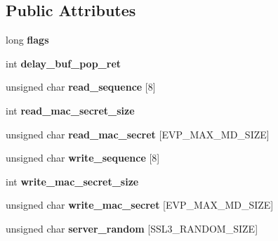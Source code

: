 \subsection*{Public Attributes}
\begin{DoxyCompactItemize}
\item 
\mbox{\label{structssl3__state__st_a8565ca9c9bebf7a771a99ef035ff6503}} 
long {\bfseries flags}
\item 
\mbox{\label{structssl3__state__st_a27a3b6185c010f82d22bfcd7feb5a43f}} 
int {\bfseries delay\+\_\+buf\+\_\+pop\+\_\+ret}
\item 
\mbox{\label{structssl3__state__st_a0d46ad2e211a7ba8fb712e66cf451d31}} 
unsigned char {\bfseries read\+\_\+sequence} \mbox{[}8\mbox{]}
\item 
\mbox{\label{structssl3__state__st_a5f9e172ca1b931c4bb0bb44e80898d15}} 
int {\bfseries read\+\_\+mac\+\_\+secret\+\_\+size}
\item 
\mbox{\label{structssl3__state__st_a650dfa61b083a05fafa16b3c62d6fe69}} 
unsigned char {\bfseries read\+\_\+mac\+\_\+secret} \mbox{[}E\+V\+P\+\_\+\+M\+A\+X\+\_\+\+M\+D\+\_\+\+S\+I\+ZE\mbox{]}
\item 
\mbox{\label{structssl3__state__st_a0ce6af56e080899190f33ebf954979ff}} 
unsigned char {\bfseries write\+\_\+sequence} \mbox{[}8\mbox{]}
\item 
\mbox{\label{structssl3__state__st_a916b1cd43d422b48e52b779e79432b5c}} 
int {\bfseries write\+\_\+mac\+\_\+secret\+\_\+size}
\item 
\mbox{\label{structssl3__state__st_a2b686268d62c7756883eea3d9f77926a}} 
unsigned char {\bfseries write\+\_\+mac\+\_\+secret} \mbox{[}E\+V\+P\+\_\+\+M\+A\+X\+\_\+\+M\+D\+\_\+\+S\+I\+ZE\mbox{]}
\item 
\mbox{\label{structssl3__state__st_ae0e0d20a2153469e1f0ee40b5852392b}} 
unsigned char {\bfseries server\+\_\+random} \mbox{[}S\+S\+L3\+\_\+\+R\+A\+N\+D\+O\+M\+\_\+\+S\+I\+ZE\mbox{]}

\end{DoxyCompactItemize}
